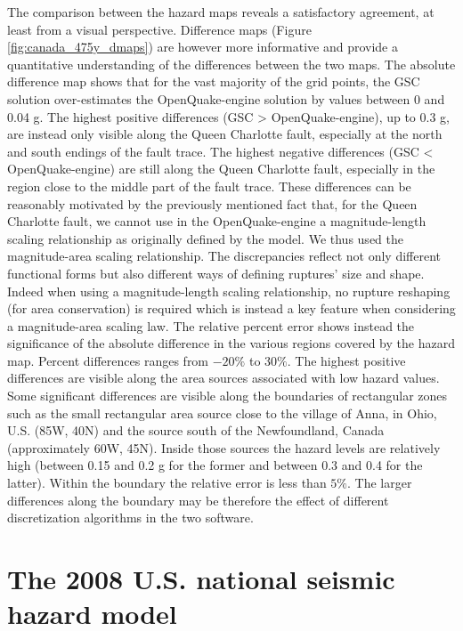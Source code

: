 The comparison between the hazard maps reveals a satisfactory agreement, at least from a visual perspective. Difference maps (Figure \ref{fig:canada_475y_dmaps}) are however more informative and provide a quantitative understanding of the differences between the two maps. The absolute difference map shows that for the vast majority of the grid points, the GSC solution over-estimates the OpenQuake-engine solution by values between 0 and 0.04 g. The highest positive differences (GSC > OpenQuake-engine), up to 0.3 g, are instead only visible along the Queen Charlotte fault, especially at the north and south endings of the fault trace. The highest negative differences (GSC < OpenQuake-engine) are still along the Queen Charlotte fault, especially in the region close to the middle part of the fault trace. These differences can be reasonably motivated by the previously mentioned fact that, for the Queen Charlotte fault, we cannot use in the OpenQuake-engine a magnitude-length scaling relationship as originally defined by the model. We thus used the \cite{wells1994} magnitude-area scaling relationship. The discrepancies reflect not only different functional forms but also different ways of defining ruptures' size and shape. Indeed when using a magnitude-length scaling relationship, no rupture reshaping (for area conservation) is required which is instead a key feature when considering a magnitude-area scaling law. The relative percent error shows instead the significance of the absolute difference in the various regions covered by the hazard map. Percent differences ranges from $-20\%$ to $30\%$. The highest positive differences are visible along the area sources associated with low hazard values. Some significant differences are visible along the boundaries of rectangular zones such as the small rectangular area source close to the village of Anna, in Ohio, U.S. (85W, 40N) and the source south of the Newfoundland, Canada (approximately 60W, 45N). Inside those sources the hazard levels are relatively high (between 0.15 and 0.2 g for the former and between 0.3 and 0.4 for the latter). Within the boundary the relative error is less than $5\%$. The larger differences along the boundary may be therefore the effect of different discretization algorithms in the two software.


\section{The 2008 U.S. national seismic hazard model}

